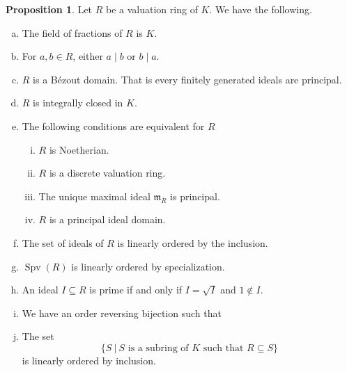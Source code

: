 \documentclass[10pt]{article}
\numberwithin{equation}{section}
\theoremstyle{definition}
\newtheorem{proposition}{Proposition}[subsection]
\DeclareMathOperator{\Spec}{Spec}
\DeclareMathOperator{\Spv}{Spv}
\newcommand{\m}[0]{\mathfrak{m}}
\newcommand{\sep}[0]{\:|\:}
\newcommand{\p}[0]{\mathfrak{p}}
\newcommand{\tand}[0]{\text{ and }}
\begin{document}
\begin{proposition}Let $R$ be a valuation ring of $K$. We have the following.
    \label{fact_7_1}
    \begin{enumerate}[a.]
        \item The field of fractions of $R$ is $K$.
        \item For $a,b\in R$, either $a\mid b$ or $b\mid a$.
        \item $R$ is a Bézout domain. That is every finitely generated ideals are principal.
        \item $R$ is integrally closed in $K$.
        \item The following conditions are equivalent for $R$
        \begin{enumerate}[i.]
            \item $R$ is Noetherian.
            \item $R$ is a discrete valuation ring.
            \item The unique maximal ideal $\m_R$ is principal.
            \item $R$ is a principal ideal domain.
        \end{enumerate}
        \item The set of ideals of $R$ is linearly ordered by the inclusion.
        \item $\Spv(R)$ is linearly ordered by specialization.
        \item An ideal $I\subseteq R$ is prime if and only if $I=\sqrt{I}$ and $1\not\in I$.
        \item We have an order reversing bijection such that
        \begin{center}
        \end{center}
        \item The set
        \begin{equation*}
            \{S\sep \text{$S$ is a subring of $K$ such that $R\subseteq S$}\}
        \end{equation*}
        is linearly ordered by inclusion.
    \end{enumerate}
\end{proposition}
\end{document}
